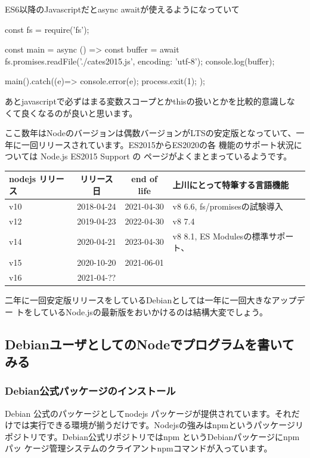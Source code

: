 \documentclass[mingoth,a4paper]{jsarticle}
\begin{document}
ES6以降のJavascriptだとasync awaitが使えるようになっていて

\begin{commandline}
const fs  = require('fs');

const main = async () => {
    const buffer = await fs.promises.readFile('./cates2015.js',
					      {encoding: 'utf-8'});
    console.log(buffer);
}

main().catch((e)=>{
    console.error(e);
    process.exit(1);
});

\end{commandline}

あとjavascriptで必ずはまる変数スコープとかthisの扱いとかを比較的意識しな
くて良くなるのが良いと思います。

ここ数年はNodeのバージョンは偶数バージョンがLTSの安定版となっていて、一
年に一回リリースされています\cite{nodejsreleases}。ES2015からES2020の各
機能のサポート状況については Node.js ES2015 Support \cite{node-green}の
ページがよくまとまっているようです。

\begin{tabular}{|l|c|c|l|}
\hline
nodejs リリース & リリース日 & end of life & 上川にとって特筆する言語機能\\
\hline
v10 & 2018-04-24 & 2021-04-30 & v8 6.6, fs/promisesの試験導入 \\
v12 & 2019-04-23 & 2022-04-30 & v8 7.4\\
v14 & 2020-04-21 & 2023-04-30 & v8 8.1, ES Modulesの標準サポート、 \\
v15 & 2020-10-20 & 2021-06-01 &  \\
v16 & 2021-04-?? &            &  \\
\hline
\end{tabular}

二年に一回安定版リリースをしているDebianとしては一年に一回大きなアップデー
トをしているNode.jsの最新版をおいかけるのは結構大変でしょう。

\subsection{DebianユーザとしてのNodeでプログラムを書いてみる}

\subsubsection{Debian公式パッケージのインストール}


Debian 公式のパッケージとしてnodejs パッケージが提供されています。それだ
けでは実行できる環境が揃うだけです。Nodejsの強みはnpmというパッケージリ
ポジトリです。Debian公式リポジトリではnpm というDebianパッケージにnpmパッ
ケージ管理システムのクライアントnpmコマンドが入っています。
\end{document}
